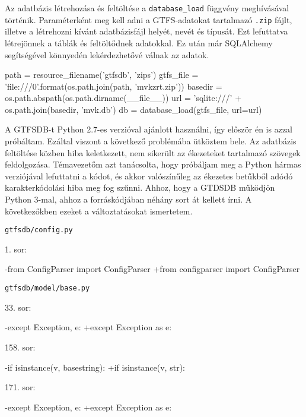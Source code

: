Az adatbázis létrehozása és feltöltése a \texttt{database\_load} függvény meghívásával történik. Paraméterként meg kell adni a GTFS-adatokat tartalmazó \texttt{.zip} fájlt, illetve a létrehozni kívánt adatbázisfájl helyét, nevét és típusát. Ezt lefuttatva létrejönnek a táblák és feltöltődnek adatokkal. Ez után már SQLAlchemy segítségével könnyedén lekérdezhetővé válnak az adatok.

\begin{python}
path = resource_filename('gtfsdb', 'zips')
gtfs_file = 'file:///{0}'.format(os.path.join(path, 'mvkzrt.zip'))
basedir = os.path.abspath(os.path.dirname(__file__))
url = 'sqlite:///' + os.path.join(basedir, 'mvk.db')
db = database_load(gtfs_file, url=url)
\end{python}

A GTFSDB-t Python 2.7-es verzióval ajánlott használni, így először én is azzal próbáltam. Ezáltal viszont a következő problémába ütköztem bele. Az adatbázis feltöltése közben hiba keletkezett, nem sikerült az ékezeteket tartalmazó szövegek feldolgozása. Témavezetőm azt tanácsolta, hogy próbáljam meg a Python hármas verziójával lefuttatni a kódot, és akkor valószínűleg az ékezetes betűkből adódó karakterkódolási hiba meg fog szűnni. Ahhoz, hogy a GTDSDB működjön Python 3-mal, ahhoz a forráskódjában néhány sort át kellett írni. A következőkben ezeket a változtatásokat ismertetem.

\newpage

\noindent \texttt{gtfsdb/config.py}

1. sor:
\begin{python}
-from ConfigParser import ConfigParser
+from configparser import ConfigParser
\end{python}

\bigskip

\bigskip

\noindent \texttt{gtfsdb/model/base.py}

33. sor:
\begin{python}
-except Exception, e:
+except Exception as e: 
\end{python}

158. sor:
\begin{python}
-if isinstance(v, basestring):
+if isinstance(v, str):
\end{python}

171. sor:
\begin{python}
-except Exception, e:
+except Exception as e:
\end{python}

